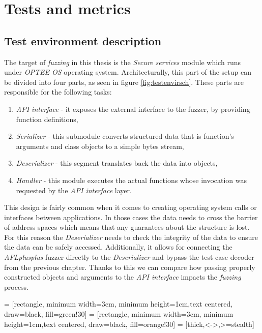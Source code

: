 \cleardoublepage
\section{Tests and metrics} \label{chap:tests}

\subsection{Test environment description}

The target of \textit{fuzzing} in this thesis is the \textit{Secure services} module which runs under \textit{OPTEE OS} operating system. Architecturally, this part of the setup can be divided into four parts, as seen in figure \ref{fig:testenvirsch}. These parts are responsible for the following tasks:
\begin{enumerate}
    \item \textit{API interface} - it exposes the external interface to the fuzzer, by providing function definitions,
    \item \textit{Serializer} - this submodule converts structured data that is function's arguments and class objects to a simple bytes stream,
    \item \textit{Deserializer} - this segment translates back the data into objects,
    \item \textit{Handler} - this module executes the actual functions whose invocation was requested by the \textit{API interface} layer.
\end{enumerate}
This design is fairly common when it comes to creating operating system calls or interfaces between applications. In those cases the data needs to cross the barrier of address spaces which means that any guarantees about the structure is lost. For this reason the \textit{Deserializer} needs to check the integrity of the data to ensure the data can be safely accessed. Additionally, it allows for connecting the \textit{AFLplusplus} fuzzer directly to the \textit{Deserializer} and bypass the  test case decoder from the previous chapter. Thanks to this we can compare how passing properly constructed objects and arguments to the \textit{API interface} impacts the \textit{fuzzing} process.

 = [rectangle, minimum width=3cm, minimum height=1cm,text centered, draw=black, fill=green!30]
 = [rectangle, minimum width=3cm, minimum height=1cm,text centered, draw=black, fill=orange!30]
 = [thick,<->,>=stealth]

